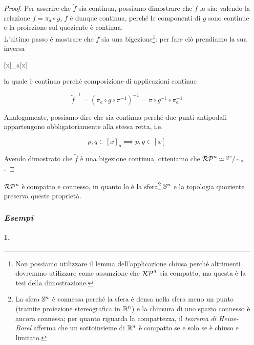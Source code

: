 \begin{proof}
	Per asserire che $ \tilde{f} $ sia continua, possiamo dimostrare che $ f $ lo sia: valendo la relazione $ f = \pi_{a} \circ g $, $ f $ è dunque continua, perché le componenti di $ g $ sono continue e la proiezione sul quoziente è continua.\\
	L'ultimo passo è mostrare che $ \tilde{f} $ sia una bigezione\footnote{%
		Non possiamo utilizzare il lemma dell'applicazione chiusa perché altrimenti dovremmo utilizzare come assunzione che $ \rp{n} $ sia compatto, ma questa è la tesi della dimostrazione.%
	}: per fare ciò prendiamo la sua inversa

		{}{}
		{[x]_{a}}{[x]}

	la quale è continua perché composizione di applicazioni continue
	
	\begin{equation}
		\tilde{f}^{-1} = (\pi_{a} \circ g \circ \pi^{-1})^{-1} = \pi \circ g^{-1} \circ \pi_{a}^{-1}
	\end{equation}

	Analogamente, possiamo dire che sia continua perché due punti antipodali appartengono obbligatoriamente alla stessa retta, i.e.
	
	\begin{equation}
		p,q \in [x]_{a} \implies p,q \in [x]
	\end{equation}

	Avendo dimostrato che $ \tilde{f} $ è una bigezione continua, otteniamo che $ \rp{n} \simeq \sfrac{\S^{n}}{\sim_{a}} $.
\end{proof}

\begin{corollary}
	$ \rp{n} $ è compatto e connesso, in quanto lo è la sfera\footnote{%
		La sfera $ \S^{n} $ è connessa perché la sfera è densa nella sfera meno un punto (tramite proiezione stereografica in $ \R^{n} $) e la chiusura di uno spazio connesso è ancora connessa; per quanto riguarda la compattezza, il \textit{teorema di Heine-Borel} afferma che un sottoinsieme di $ \R^{n} $ è compatto se e solo se è chiuso e limitato.%
	} $ \S^{n} $ e la topologia quoziente preserva queste proprietà.
\end{corollary}

\subsubsection{\textit{Esempi}}

\paragraph{1.}

